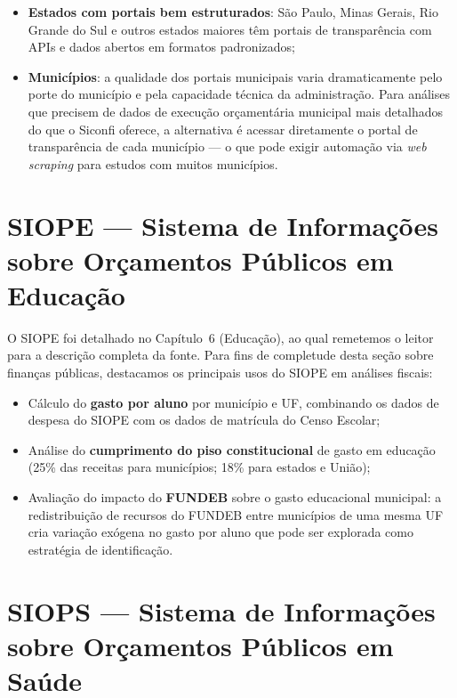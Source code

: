 \begin{itemize}
  \item \textbf{Estados com portais bem estruturados}: São Paulo, Minas Gerais, Rio Grande do Sul e outros estados maiores têm portais de transparência com APIs e dados abertos em formatos padronizados;
  \item \textbf{Municípios}: a qualidade dos portais municipais varia dramaticamente pelo porte do município e pela capacidade técnica da administração. Para análises que precisem de dados de execução orçamentária municipal mais detalhados do que o Siconfi oferece, a alternativa é acessar diretamente o portal de transparência de cada município --- o que pode exigir automação via \textit{web scraping} para estudos com muitos municípios.
\end{itemize}

\section{SIOPE --- Sistema de Informações sobre Orçamentos
         Públicos em Educação}

O SIOPE foi detalhado no Capítulo~6 (Educação), ao qual remetemos o leitor para a descrição completa da fonte. Para fins de completude desta seção sobre finanças públicas, destacamos os principais usos do SIOPE em análises fiscais:

\begin{itemize}
  \item Cálculo do \textbf{gasto por aluno} por município e UF, combinando os dados de despesa do SIOPE com os dados de matrícula do Censo Escolar;
  \item Análise do \textbf{cumprimento do piso constitucional} de gasto em educação (25\% das receitas para municípios; 18\% para estados e União);
  \item Avaliação do impacto do \textbf{FUNDEB} sobre o gasto educacional municipal: a redistribuição de recursos do FUNDEB entre municípios de uma mesma UF cria variação exógena no gasto por aluno que pode ser explorada como estratégia de identificação.
\end{itemize}

\section{SIOPS --- Sistema de Informações sobre Orçamentos
         Públicos em Saúde}

